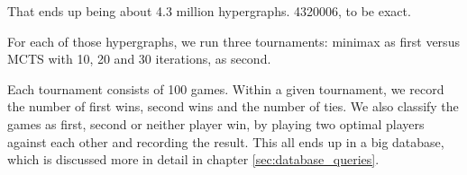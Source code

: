 That ends up being about 4.3 million hypergraphs. 4320006, to be exact.

For each of those hypergraphs, we run three tournaments: minimax as first versus MCTS with 10, 20 and 30 iterations, as second.

Each tournament consists of 100 games. Within a given tournament, we record the number of first wins, second wins and the number of ties.
We also classify the games as first, second or neither player win, by playing two optimal players against each other and recording the result.
This all ends up in a big database, which is discussed more in detail in chapter \ref{sec:database_queries}.
